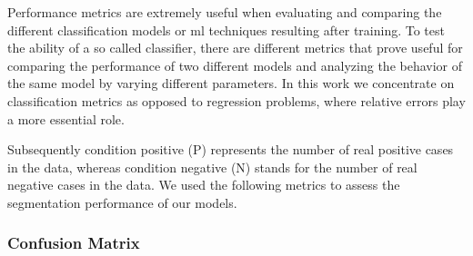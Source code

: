 Performance metrics are extremely useful when evaluating and comparing the different classification models or \acrshort{ml} techniques resulting after training. To test the ability of a so called classifier, there are different metrics that prove useful for comparing the performance of two different models and analyzing the behavior of the same model by varying different parameters. In this work we concentrate on classification metrics as opposed to \gls{regression} problems, where relative errors play a more essential role.

Subsequently condition positive (P) represents the number of real positive cases in the data, whereas condition negative (N) stands for the number of real negative cases in the data. We used the following metrics to assess the segmentation performance of our models.

\subsubsection{Confusion Matrix}

